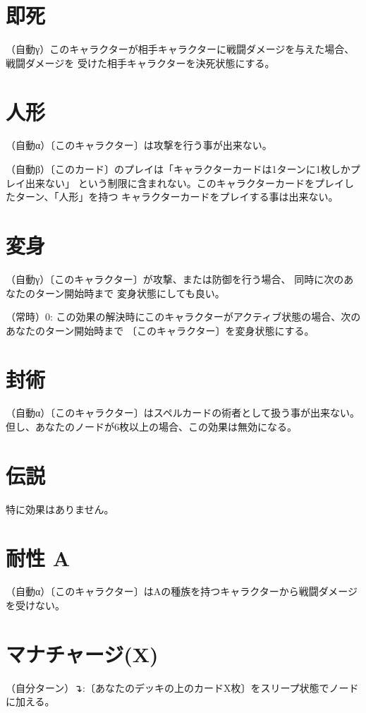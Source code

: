 \documentclass[fontsize=9pt,twocolumn,hanging_punctuation]{jlreq}
\newcommand{\↴}{{\fontspec{HackGen}↴}}
\begin{document}
\section*{即死}
（自動γ）このキャラクターが相手キャラクターに戦闘ダメージを与えた場合、戦闘ダメージを
受けた相手キャラクターを決死状態にする。

\section*{人形}
（自動α）〔このキャラクター〕は攻撃を行う事が出来ない。

（自動β）〔このカード〕のプレイは「キャラクターカードは1ターンに1枚しかプレイ出来ない」
という制限に含まれない。このキャラクターカードをプレイしたターン、「人形」を持つ
キャラクターカードをプレイする事は出来ない。

\section*{変身}
（自動γ）〔このキャラクター〕が攻撃、または防御を行う場合、 同時に次のあなたのターン開始時まで
変身状態にしても良い。

（常時）0: この効果の解決時にこのキャラクターがアクティブ状態の場合、次のあなたのターン開始時まで
〔このキャラクター〕を変身状態にする。

\section*{封術}
（自動α）〔このキャラクター〕はスペルカードの術者として扱う事が出来ない。
但し、あなたのノードが6枚以上の場合、この効果は無効になる。

\section*{伝説}
特に効果はありません。

\pagebreak
\section*{耐性 A}
（自動α）〔このキャラクター〕はAの種族を持つキャラクターから戦闘ダメージを受けない。

\section*{マナチャージ(X)}
（自分ターン）\↴:〔あなたのデッキの上のカードX枚〕をスリープ状態でノードに加える。
\end{document}

